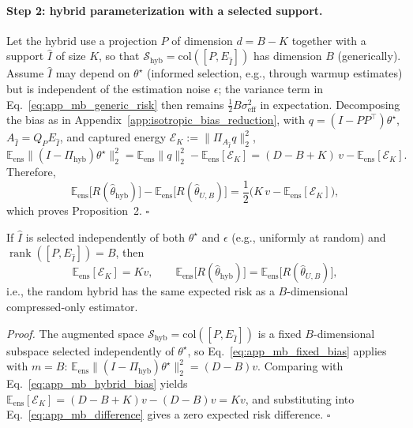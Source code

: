 \paragraph{Step 2: hybrid parameterization with a selected support.}
Let the hybrid use a projection $P$ of dimension $d=B-K$ together with a support $\hat{I}$ of size $K$, so that $\mathcal{S}_{\mathrm{hyb}}=\mathrm{col}([P,E_{\hat{I}}])$ has dimension $B$ (generically).
Assume $\hat{I}$ may depend on $\theta^\star$ (informed selection, e.g., through warmup estimates) but is independent of the estimation noise $\epsilon$; the variance term in Eq.~\eqref{eq:app_mb_generic_risk} then remains $\frac{1}{2}B\sigma_{\mathrm{eff}}^2$ in expectation.
Decomposing the bias as in Appendix~\ref{app:isotropic_bias_reduction}, with $q=(I-PP^\top)\theta^\star$, $A_{\hat{I}}=Q_PE_{\hat{I}}$, and captured energy $\mathcal{E}_K:=\|\Pi_{A_{\hat{I}}}q\|_2^2$,
\begin{equation}
\mathbb E_{\mathrm{ens}}\big\|(I-\Pi_{\mathrm{hyb}})\theta^\star\big\|_2^2
=
\mathbb E_{\mathrm{ens}}\|q\|_2^2-\mathbb E_{\mathrm{ens}}[\mathcal{E}_K]
=
(D-B+K)\,v-\mathbb E_{\mathrm{ens}}[\mathcal{E}_K].
\label{eq:app_mb_hybrid_bias}
\end{equation}
Therefore,
\begin{equation}
\mathbb E_{\mathrm{ens}}\big[R(\hat{\theta}_{\mathrm{hyb}})\big]
-
\mathbb E_{\mathrm{ens}}\big[R(\hat{\theta}_{U,B})\big]
=
\frac{1}{2}\Big(K\,v-\mathbb E_{\mathrm{ens}}[\mathcal{E}_K]\Big),
\label{eq:app_mb_difference}
\end{equation}
which proves Proposition~2. \hfill$\square$

\begin{corollary}
\label{cor:random_support}
If $\hat{I}$ is selected independently of both $\theta^\star$ and $\epsilon$ (e.g., uniformly at random) and $\operatorname{rank}([P,E_{\hat{I}}])=B$, then
\begin{equation}
\mathbb E_{\mathrm{ens}}[\mathcal{E}_K]=Kv,
\qquad
\mathbb E_{\mathrm{ens}}\big[R(\hat{\theta}_{\mathrm{hyb}})\big]
=
\mathbb E_{\mathrm{ens}}\big[R(\hat{\theta}_{U,B})\big],
\label{eq:app_mb_random_support}
\end{equation}
i.e., the random hybrid has the same expected risk as a $B$-dimensional compressed-only estimator.
\end{corollary}

\emph{Proof.}
The augmented space $\mathcal{S}_{\mathrm{hyb}}=\mathrm{col}([P,E_{\hat{I}}])$ is a fixed $B$-dimensional subspace selected independently of $\theta^\star$, so Eq.~\eqref{eq:app_mb_fixed_bias} applies with $m=B$:
$\mathbb E_{\mathrm{ens}}\|(I-\Pi_{\mathrm{hyb}})\theta^\star\|_2^2=(D-B)v$.
Comparing with Eq.~\eqref{eq:app_mb_hybrid_bias} yields $\mathbb E_{\mathrm{ens}}[\mathcal{E}_K]=(D-B+K)v-(D-B)v=Kv$, and substituting into Eq.~\eqref{eq:app_mb_difference} gives a zero expected risk difference. \hfill$\square$

